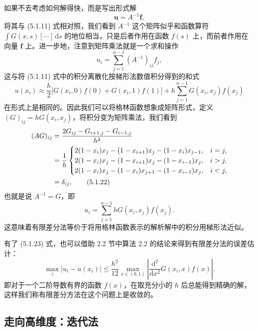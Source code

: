 如果不去考虑如何解得快，而是写出形式解
\begin{equation}
\bm u=A^{-1}\bm f,
\tag{5.1.20}
\end{equation}
将其与 (5.1.11) 式相对照，我们看到 $A^{-1}$ 这个矩阵似乎和函数算符 $\int G(x,s)[\cdots] \,\mathrm ds$ 的地位相当，只是后者作用在函数 $f(s)$ 上，而前者作用在向量 $\bm f$ 上。进一步地，注意到矩阵乘法就是一个求和操作
\[
u_i=\sum_{j=1}^{n-1}(A^{-1})_{ij}f_j,
\]
这与将 (5.1.11) 式中的积分离散化按梯形法数值积分得到的和式
\begin{equation}
u(x_i)\approx\frac h2\bigl[G(x_i,0)f(0)+G(x_i,1)f(1)\bigr]+h\sum_{j=1}^{n-1}G(x_i,x_j)f(x_j)
\tag{5.1.21}
\end{equation}
在形式上是相同的。因此我们可以将格林函数想象成矩阵形式，定义 $(G)_{ij}=hG(x_i,x_j)$，将积分变为矩阵乘法，我们看到
\begin{align}
(AG)_{ij}
&=\frac{2G_{ij}-G_{i+1,j}-G_{i-1,j}}{h^2}\notag\\
&=\frac1h
\begin{cases}
2(1-x_i)x_j-(1-x_{i+1})x_j-(1-x_i)x_{j-1},& i=j,\\
2(1-x_i)x_j-(1-x_{i+1})x_j-(1-x_{i-1})x_j,& i>j,\\
2(1-x_i)x_j-(1-x_i)x_{j+1}-(1-x_{i-1})x_j,& i<j,
\end{cases}\notag\\
&=\delta_{ij},
\tag{5.1.22}
\end{align}
也就是说 $A^{-1}=G$，即
\begin{equation}
u_i=\sum_{j=1}^{n-1}hG(x_i,x_j)f(x_j).
\tag{5.1.23}
\end{equation}
这意味着有限差分法等价于将用格林函数表示的解析解中的积分用梯形法近似。

有了 (5.1.23) 式，也可以借助 2.2 节中算法 2.2 的结论来得到有限差分法的误差估计：
\begin{equation}
\max_i|u_i-u(x_i)|\le\frac{h^2}{12}\max_{x\in(0,1)}\left|\frac{\mathrm d^2}{\mathrm dx^2}G(x_i,x)f(x)\right|.
\tag{5.1.24}
\end{equation}
即对于一个二阶导数有界的函数 $f(x)$，在取充分小的 $h$ 后总能得到精确的解，这样我们称有限差分方法在这个问题上是收敛的。

\subsection{走向高维度：迭代法}

